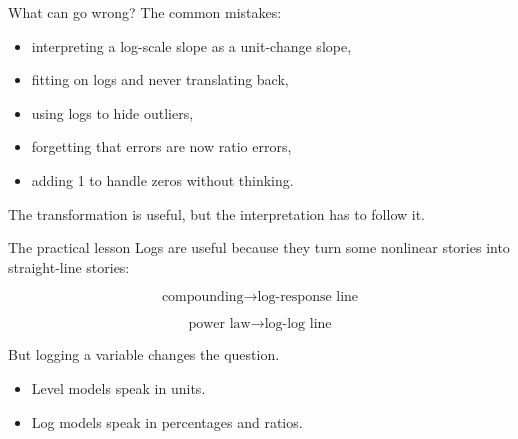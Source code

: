 \documentclass[
  ignorenonframetext,
  aspectratio=43,
]{beamer}
\providecommand{\tightlist}{%
  \setlength{\itemsep}{0pt}\setlength{\parskip}{0pt}}\usepackage{longtable,booktabs,array}
\begin{document}
\begin{frame}{What can go wrong?}
\label{what-can-go-wrong}
The common mistakes:

\begin{itemize}
\tightlist
\item
  interpreting a log-scale slope as a unit-change slope,
\item
  fitting on logs and never translating back,
\item
  using logs to hide outliers,
\item
  forgetting that errors are now ratio errors,
\item
  adding 1 to handle zeros without thinking.
\end{itemize}

The transformation is useful, but the interpretation has to follow it.
\end{frame}

\begin{frame}{The practical lesson}
\label{the-practical-lesson}
Logs are useful because they turn some nonlinear stories into
straight-line stories:

\[
\text{compounding} \rightarrow \text{log-response line}
\]

\[
\text{power law} \rightarrow \text{log-log line}
\]

But logging a variable changes the question.

\begin{itemize}
\tightlist
\item
  Level models speak in units.
\item
  Log models speak in percentages and ratios.
\end{itemize}
\end{frame}
\end{document}
